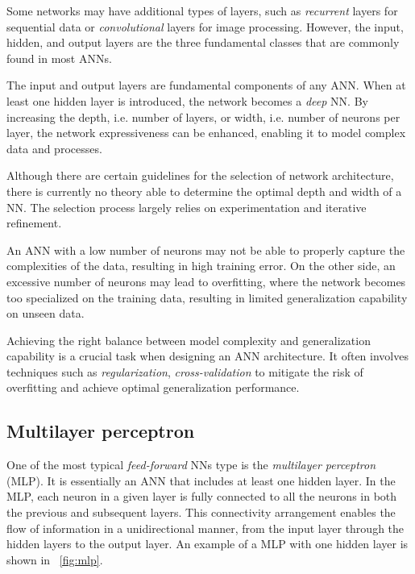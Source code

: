 Some networks may have additional types of layers, such as \textit{recurrent} layers for sequential data or \textit{convolutional} layers for image processing. However, the input, hidden, and output layers are the three fundamental classes that are commonly found in most ANNs.

The input and output layers are fundamental components of any ANN. When at least one hidden layer is introduced, the network becomes a \textit{deep} NN. By increasing the depth, i.e. number of layers, or width, i.e. number of neurons per layer, the network expressiveness can be enhanced, enabling it to model complex data and processes.

Although there are certain guidelines for the selection of network architecture, there is currently no theory able to determine the optimal depth and width of a NN. The selection process largely relies on experimentation and iterative refinement.

An ANN with a low number of neurons may not be able to properly capture the complexities of the data, resulting in high training error. On the other side, an excessive number of neurons may lead to overfitting, where the network becomes too specialized on the training data, resulting in limited generalization capability on unseen data.

Achieving the right balance between model complexity and generalization capability is a crucial task when designing an ANN architecture. It often involves techniques such as \textit{regularization}, \textit{cross-validation} to mitigate the risk of overfitting and achieve optimal generalization performance.

\subsection{Multilayer perceptron}

One of the most typical \textit{feed-forward} NNs type is the \textit{multilayer perceptron} (MLP). It is essentially an ANN that includes at least one hidden layer. In the MLP, each neuron in a given layer is fully connected to all the neurons in both the previous and subsequent layers. This connectivity arrangement enables the flow of information in a unidirectional manner, from the input layer through the hidden layers to the output layer.  An example of a MLP with one hidden layer is shown in \Fig~\ref{fig:mlp}.

